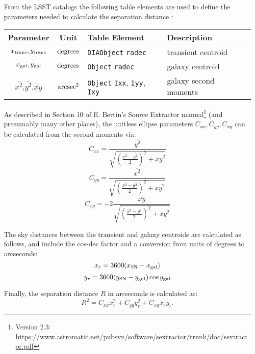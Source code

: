 \documentclass[DM,lsstdraft,authoryear,toc]{lsstdoc}
\begin{document}
From the LSST catalogs the following table elements are used to define the parameters needed to calculate the separation distance :
\begin{center}
\begin{tabular}{ccll}
\hline
Parameter & Unit & Table Element & Description \\
\hline
$x_{\rm trans},y_{\rm trans}$ & $\rm degrees$ & {\tt DIAObject} {\tt radec} & transient centroid  \\
$x_{\rm gal},y_{\rm gal}$       & $\rm degrees$ & {\tt Object} {\tt radec}       & galaxy centroid      \\
$\overline{x^2}$,$\overline{y^2}$,$\overline{xy}$ & $\rm arcsec^2$  & {\tt Object} {\tt Ixx}, {\tt Iyy}, {\tt Ixy} & galaxy second moments \\
\hline
\end{tabular}
\end{center}

As described in Section 10 of E. Bertin's Source Extractor manual\footnote{Version 2.3: \url{https://www.astromatic.net/pubsvn/software/sextractor/trunk/doc/sextractor.pdf}} (and presumably many other places), the unitless ellipse parameters $C_{xx},C_{yy},C_{xy}$ can be calculated from the second moments via:
\begin{equation}
C_{xx} = \frac{\overline{y^2}}{\sqrt{ \left( \frac{\overline{x^2}-\overline{y^2}}{2} \right)^2 + \overline{xy}^2}}
\end{equation}
\begin{equation}
C_{yy} = \frac{\overline{x^2}}{\sqrt{ \left( \frac{\overline{x^2}-\overline{y^2}}{2} \right)^2 + \overline{xy}^2}}
\end{equation}
\begin{equation}
C_{xy} = -2 \frac{\overline{xy}}{\sqrt{ \left( \frac{\overline{x^2}-\overline{y^2}}{2} \right)^2 + \overline{xy}^2}}
\end{equation}

The sky distances between the transient and galaxy centroids are calculated as follows, and include the cos-dec factor and a conversion from units of degrees to arcseconds:
\begin{equation}
x_r = 3600(x_{\rm SN} - x_{\rm gal})
\end{equation}
\begin{equation}
y_r = 3600(y_{\rm SN} - y_{\rm gal})\cos{y_{\rm gal}}
\end{equation}

Finally, the separation distance $R$ in arcseconds is calculated as:
\begin{equation}
R^2 = C_{xx} x_r^2 + C_{yy} y_r^2 + C_{xy} x_r y_r.
\end{equation}


\clearpage

\end{document}
